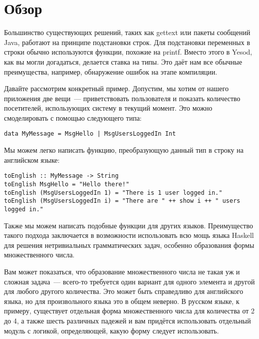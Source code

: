 
\section{Обзор}

Большинство существующих решений, таких как gettext или пакеты сообщений Java,
работают на принципе подстановки строк. Для подстановки переменных в строки
обычно используются функции, похожие на printf. Вместо этого в Yesod, как вы
могли догадаться, делается ставка на типы. Это даёт нам все обычные
преимущества, например, обнаружение ошибок на этапе компиляции.

Давайте рассмотрим конкретный пример. Допустим, мы хотим от нашего приложения
две вещи~--- приветствовать пользователя и показать количество посетителей,
использующих систему в текущий момент. Это можно смоделировать с помощью
следующего типа:

\begin{lstlisting}
data MyMessage = MsgHello | MsgUsersLoggedIn Int
\end{lstlisting}

Мы можем легко написать функцию, преобразующую данный тип в строку на
английском языке:

\begin{lstlisting}
toEnglish :: MyMessage -> String
toEnglish MsgHello = "Hello there!"
toEnglish (MsgUsersLoggedIn 1) = "There is 1 user logged in."
toEnglish (MsgUsersLoggedIn i) = "There are " ++ show i ++ " users logged in."
\end{lstlisting}

Также мы можем написать подобные функции для других языков. Преимущество такого
подхода заключается в возможности использовать всю мощь языка Haskell для
решения нетривиальных грамматических задач, особенно образования формы
множественного числа.

\begin{remark}
    Вам может показаться, что образование множественного числа не такая уж и
    сложная задача~--- всего-то требуется один вариант для одного элемента и
    другой для любого другого количества. Это может быть справедливо для
    английского языка, но для произвольного языка это в общем неверно. В
    русском языке, к примеру, существует отдельная форма множественного числа
    для количества от 2 до 4, а также шесть различных падежей и вам придётся
    использовать отдельный модуль с логикой, определяющей, какую форму следует
    использовать.
\end{remark}

